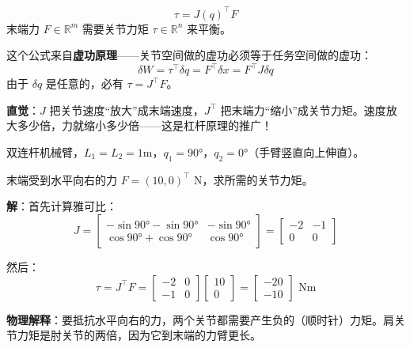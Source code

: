 \begin{keytheorem}[title=力/力矩转换]
\begin{equation}
\boxed{\tau = J(q)^\top F}
\end{equation}
末端力 $F \in \mathbb{R}^m$ 需要关节力矩 $\tau \in \mathbb{R}^n$ 来平衡。
\end{keytheorem}

\begin{physicalmeaning}
这个公式来自\textbf{虚功原理}——关节空间做的虚功必须等于任务空间做的虚功：
\[
\delta W = \tau^\top \delta q = F^\top \delta x = F^\top J \delta q
\]
由于 $\delta q$ 是任意的，必有 $\tau = J^\top F$。

\textbf{直觉}：$J$ 把关节速度“放大”成末端速度，$J^\top$ 把末端力“缩小”成关节力矩。速度放大多少倍，力就缩小多少倍——这是杠杆原理的推广！
\end{physicalmeaning}

\begin{example}[力的传递]
双连杆机械臂，$L_1 = L_2 = 1$m，$q_1 = 90°$，$q_2 = 0°$（手臂竖直向上伸直）。

末端受到水平向右的力 $F = (10, 0)^\top$ N，求所需的关节力矩。

\textbf{解}：首先计算雅可比：
\[
J = \begin{bmatrix}
-\sin 90° - \sin 90° & -\sin 90° \\
\cos 90° + \cos 90° & \cos 90°
\end{bmatrix}
= \begin{bmatrix}
-2 & -1 \\
0 & 0
\end{bmatrix}
\]

然后：
\[
\tau = J^\top F = \begin{bmatrix} -2 & 0 \\ -1 & 0 \end{bmatrix} \begin{bmatrix} 10 \\ 0 \end{bmatrix}
= \begin{bmatrix} -20 \\ -10 \end{bmatrix} \text{ Nm}
\]

\textbf{物理解释}：要抵抗水平向右的力，两个关节都需要产生负的（顺时针）力矩。肩关节力矩是肘关节的两倍，因为它到末端的力臂更长。
\end{example}


